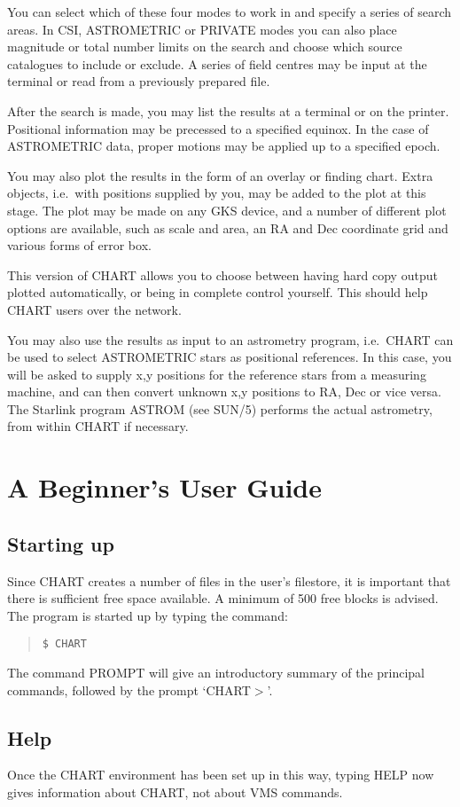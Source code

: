 \documentclass{article}
\begin{document}
You can select which of these four modes to work in and specify a series of
search areas.
In CSI, ASTROMETRIC or PRIVATE modes you can also place magnitude or total
number limits on the search and choose which source catalogues to include or
exclude.
A series of field centres may be input at the terminal or read from a previously
prepared file.

After the search is made, you may list the results at a terminal or on the
printer.
Positional information may be precessed to a specified equinox.
In the case of ASTROMETRIC data, proper motions may be applied up to a specified
epoch.

You may also plot the results in the form of an overlay or finding chart.
Extra objects, i.e.\ with positions supplied by you, may be added to the plot at
this stage.
The plot may be made on any GKS device, and a number of different plot options
are available, such as scale and area, an RA and Dec coordinate grid and various
forms of error box.

This version of CHART allows you to choose between having hard copy 
output plotted automatically, or being in complete control yourself.
This should help CHART users over the network.

You may also use the results as input to an astrometry program, i.e.\ CHART
can be used to select ASTROMETRIC stars as positional references.
In this case, you will be asked to supply x,y positions for the reference
stars from a measuring machine, and can then convert unknown x,y positions to
RA, Dec or vice versa.
The Starlink program ASTROM (see SUN/5) performs the actual astrometry, from
within CHART if necessary.
\section{A Beginner's User Guide}
\subsection{Starting up}
Since CHART creates a number of files in the user's filestore, it is important
that there is sufficient free space available.
A minimum of 500 free blocks is advised.
The program is started up by typing the command:
\begin{quote}
{\tt \$ CHART}
\end{quote}
The command PROMPT will give an introductory summary of the principal commands,
followed by the prompt `CHART$>$'.
\subsection{Help}
Once the CHART environment has been set up in this way, typing HELP now gives
information about CHART, not about VMS commands.
\end{document}
